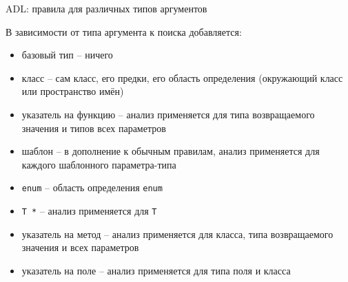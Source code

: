 \documentclass[unknownkeysallowed,xcolor=table]{beamer}
\begin{document}
\begin{frame}{ADL: правила для различных типов аргументов}

  В зависимости от типа аргумента к поиска добавляется:

  \begin{itemize}
    \item базовый тип -- ничего
    \item класс -- сам класс, его предки, его область определения (окружающий класс или пространство имён)
    \item указатель на функцию -- анализ применяется для типа возвращаемого значения и типов всех параметров
    \item шаблон -- в дополнение к обычным правилам, анализ применяется для каждого шаблонного параметра-типа
    \item \lstinline{enum} -- область определения \lstinline{enum}
    \item \lstinline{T *} -- анализ применяется для \lstinline{T}
    \item указатель на метод -- анализ применяется для класса, типа возвращаемого значения и всех параметров
    \item указатель на поле -- анализ применяется для типа поля и класса
  \end{itemize}
\end{frame}
\end{document}
